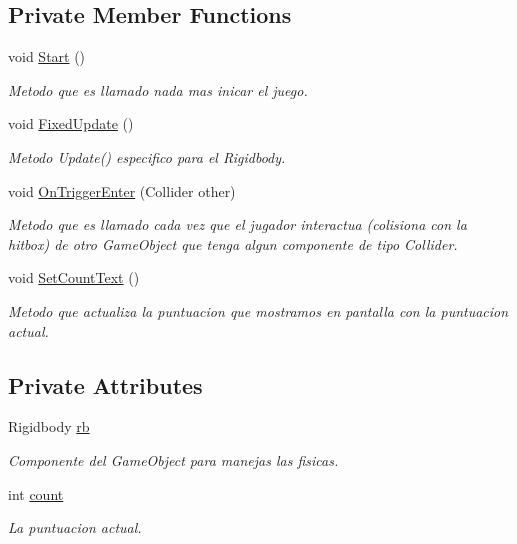 \subsection*{Private Member Functions}
\begin{DoxyCompactItemize}
\item 
void \hyperlink{class_player_controller_ae1117d9c4da3193181cddad2c814e467}{Start} ()
\begin{DoxyCompactList}\small\item\em Metodo que es llamado nada mas inicar el juego. \end{DoxyCompactList}\item 
void \hyperlink{class_player_controller_ae5bdb1b48571f67c3f722a58b6f404d4}{Fixed\+Update} ()
\begin{DoxyCompactList}\small\item\em Metodo Update() especifico para el Rigidbody. \end{DoxyCompactList}\item 
void \hyperlink{class_player_controller_a2a0510e318c75ef04e45b4ece3bd31cd}{On\+Trigger\+Enter} (Collider other)
\begin{DoxyCompactList}\small\item\em Metodo que es llamado cada vez que el jugador interactua (colisiona con la hitbox) de otro Game\+Object que tenga algun componente de tipo Collider. \end{DoxyCompactList}\item 
void \hyperlink{class_player_controller_ad55b05bf5e6a5ae39a2a01700f1772ce}{Set\+Count\+Text} ()
\begin{DoxyCompactList}\small\item\em Metodo que actualiza la puntuacion que mostramos en pantalla con la puntuacion actual. \end{DoxyCompactList}\end{DoxyCompactItemize}
\subsection*{Private Attributes}
\begin{DoxyCompactItemize}
\item 
Rigidbody \hyperlink{class_player_controller_a93b9fa76e5456725594e87dd40f93611}{rb}
\begin{DoxyCompactList}\small\item\em Componente del Game\+Object para manejas las fisicas. \end{DoxyCompactList}\item 
int \hyperlink{class_player_controller_ac44590ddcba0af5af97eb025a56f9ae5}{count}
\begin{DoxyCompactList}\small\item\em La puntuacion actual. \end{DoxyCompactList}\end{DoxyCompactItemize}



